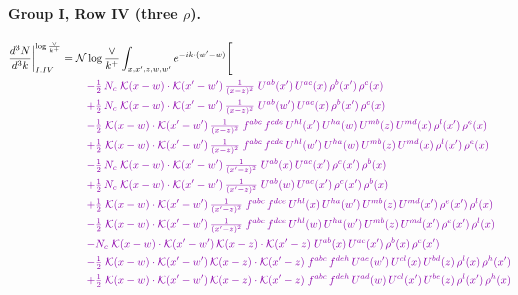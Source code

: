 \documentclass[10pt]{article}
\numberwithin{equation}{section}
\newcommand{\NNv}{\mathcal N\log\frac{\vee}{k^+}}
\begin{document}
\paragraph{Group I, Row IV (three $\rho$).}
\begin{align}
\frac{d^3N}{d^3k}\bigg|^{\log\frac{\vee}{k^+}}_{I.IV}={}&\NNv\int_{x,x',z,w,w'}e^{-ik\cdot(w'-w)}\Bigg[\notag\\
&\quad{\color{CC}-\tfrac{1}{2}\,N_c\;\mathcal{K}(x-w)\cdot\mathcal{K}(x'-w')\,\tfrac{1}{(x-z)^{2}}\;U^{ab}(x')\,U^{ac}(x)\,\rho^{b}(x')\,\rho^{c}(x)}\notag\\
&\quad{\color{CC}+\tfrac{1}{2}\,N_c\;\mathcal{K}(x-w)\cdot\mathcal{K}(x'-w')\,\tfrac{1}{(x-z)^{2}}\;U^{ab}(w')\,U^{ac}(x)\,\rho^{b}(x')\,\rho^{c}(x)}\notag\\
&\quad{\color{CC}-\tfrac{1}{2}\;\mathcal{K}(x-w)\cdot\mathcal{K}(x'-w')\,\tfrac{1}{(x-z)^{2}}\;f^{abc}\,f^{cde}\,U^{hl}(x')\,U^{ha}(w)\,U^{mb}(z)\,U^{md}(x)\,\rho^{l}(x')\,\rho^{e}(x)}\notag\\
&\quad{\color{CC}+\tfrac{1}{2}\;\mathcal{K}(x-w)\cdot\mathcal{K}(x'-w')\,\tfrac{1}{(x-z)^{2}}\;f^{abc}\,f^{cde}\,U^{hl}(w')\,U^{ha}(w)\,U^{mb}(z)\,U^{md}(x)\,\rho^{l}(x')\,\rho^{e}(x)}\notag\\
&\quad{\color{CC}-\tfrac{1}{2}\,N_c\;\mathcal{K}(x-w)\cdot\mathcal{K}(x'-w')\,\tfrac{1}{(x'-z)^{2}}\;U^{ab}(x)\,U^{ac}(x')\,\rho^{c}(x')\,\rho^{b}(x)}\notag\\
&\quad{\color{CC}+\tfrac{1}{2}\,N_c\;\mathcal{K}(x-w)\cdot\mathcal{K}(x'-w')\,\tfrac{1}{(x'-z)^{2}}\;U^{ab}(w)\,U^{ac}(x')\,\rho^{c}(x')\,\rho^{b}(x)}\notag\\
&\quad{\color{CC}+\tfrac{1}{2}\;\mathcal{K}(x-w)\cdot\mathcal{K}(x'-w')\,\tfrac{1}{(x'-z)^{2}}\;f^{abc}\,f^{dce}\,U^{hl}(x)\,U^{ha}(w')\,U^{mb}(z)\,U^{md}(x')\,\rho^{e}(x')\,\rho^{l}(x)}\notag\\
&\quad{\color{CC}-\tfrac{1}{2}\;\mathcal{K}(x-w)\cdot\mathcal{K}(x'-w')\,\tfrac{1}{(x'-z)^{2}}\;f^{abc}\,f^{dce}\,U^{hl}(w)\,U^{ha}(w')\,U^{mb}(z)\,U^{md}(x')\,\rho^{e}(x')\,\rho^{l}(x)}\notag\\
&\quad{\color{CC}-N_c\;\mathcal{K}(x-w)\cdot\mathcal{K}(x'-w')\,\mathcal{K}(x-z)\cdot\mathcal{K}(x'-z)\;U^{ab}(x)\,U^{ac}(x')\,\rho^{b}(x)\,\rho^{c}(x')}\notag\\
&\quad{\color{CC}-\tfrac{1}{2}\;\mathcal{K}(x-w)\cdot\mathcal{K}(x'-w')\,\mathcal{K}(x-z)\cdot\mathcal{K}(x'-z)\;f^{abc}\,f^{deh}\,U^{ae}(w')\,U^{cl}(x)\,U^{bd}(z)\,\rho^{l}(x)\,\rho^{h}(x')}\notag\\
&\quad{\color{CC}+\tfrac{1}{2}\;\mathcal{K}(x-w)\cdot\mathcal{K}(x'-w')\,\mathcal{K}(x-z)\cdot\mathcal{K}(x'-z)\;f^{abc}\,f^{deh}\,U^{ad}(w)\,U^{cl}(x')\,U^{be}(z)\,\rho^{l}(x')\,\rho^{h}(x)}\notag\\

\end{align}
\end{document}
